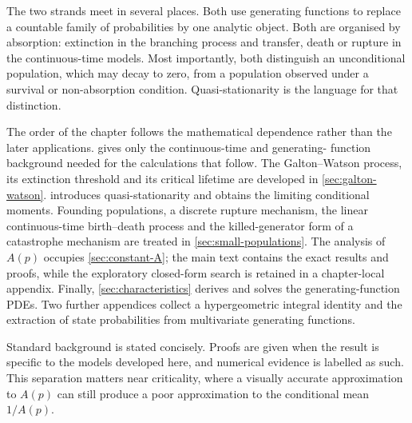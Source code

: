 The two strands meet in several places.  Both use generating functions to replace a
countable family of probabilities by one analytic object.  Both are organised by
absorption: extinction in the branching process and transfer, death or rupture in
the continuous-time models.  Most importantly, both distinguish an unconditional
population, which may decay to zero, from a population observed under a survival or
non-absorption condition.  Quasi-stationarity is the language for that distinction.

The order of the chapter follows the mathematical dependence rather than the later
applications.   gives only the continuous-time and generating-
function background needed for the calculations that follow.  The Galton--Watson
process, its extinction threshold and its critical lifetime are developed in
\cref{sec:galton-watson}.   introduces quasi-stationarity and obtains
the limiting conditional moments.  Founding populations, a discrete rupture
mechanism, the linear continuous-time birth--death process and the killed-generator
form of a catastrophe mechanism are treated in \cref{sec:small-populations}.  The
analysis of \(A(p)\) occupies
\cref{sec:constant-A}; the main text contains the exact results and proofs, while the
exploratory closed-form search is retained in a chapter-local appendix.  Finally,
\cref{sec:characteristics} derives and solves the generating-function PDEs.  Two
further appendices collect a hypergeometric integral identity and the extraction of
state probabilities from multivariate generating functions.

Standard background is stated concisely.  Proofs are given when the result is
specific to the models developed here, and numerical evidence is labelled as such.
This separation matters near criticality, where a visually accurate approximation
to \(A(p)\) can still produce a poor approximation to the conditional mean \(1/A(p)\).
